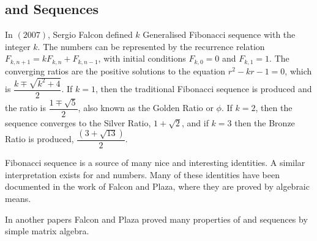 \begin{large}
\subsection*{ \kF\hspace{0mm} and \kL\hspace{0mm} Sequences}
\noindent In $(2007)$, Sergio Falcon \cite{fal-1} defined $k$ Generalised Fibonacci sequence  with  the integer $k$. The \kF\hspace{0mm} numbers can be represented by the recurrence relation $F_{k,n+1}=k F_{k,n} + F_{k,n-1}$, with initial conditions $F_{k,0} = 0$ and $F_{k,1} =1$. The converging ratios are the positive solutions to the equation $r^2-kr-1 = 0$, which is $\dfrac{k\mp \sqrt{k^2+4}}{2}$. If $k=1$, then the traditional Fibonacci sequence is produced and the ratio is $\dfrac{1 \mp \sqrt{5}}{2}$, also known as the Golden Ratio or $\phi$. If $k=2$, then the sequence converges to the Silver Ratio, $1+\sqrt{2}$, and if $k=3$ then the Bronze Ratio is produced, $\dfrac{(3+\sqrt{13})}{2}$. 

\noindent Fibonacci sequence is a source of many nice and interesting identities. A similar interpretation exists for \kF\hspace{0mm} and \kL\hspace{0mm} numbers. Many of these identities have been documented in the work of Falcon and Plaza, where they are proved by algebraic means.

\noindent In another papers \cite{fal-2, fal-3, fal-4,fal-5, fal-6, fal-7} Falcon and Plaza proved many  properties of \kF\hspace{0mm} and \kL\hspace{0mm} sequences by simple matrix algebra. 


\end{large}
